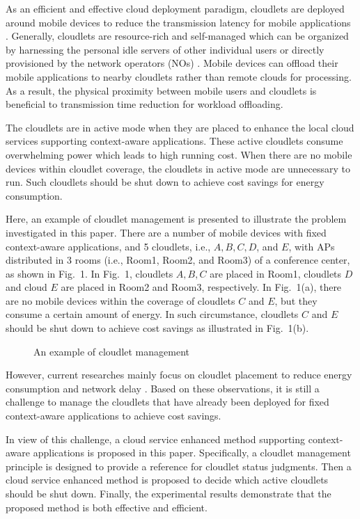 \documentclass{llncs}
\begin{document}
As an efficient and effective cloud deployment paradigm, cloudlets are deployed around mobile devices to reduce the transmission latency for mobile applications \cite{rimal:van,dinh:lee}. Generally, cloudlets are resource-rich and self-managed which can be organized by harnessing the personal idle servers of other individual users or directly provisioned by the network operators (NOs) \cite{lo:gao}. Mobile devices can offload their mobile applications to nearby cloudlets rather than remote clouds for processing. As a result, the physical proximity between mobile users and cloudlets is beneficial to transmission time reduction for workload offloading.

The cloudlets are in active mode when they are placed to enhance the local cloud services supporting context-aware applications. These active cloudlets consume overwhelming power which leads to high running cost. When there are no mobile devices within cloudlet coverage, the cloudlets in active mode are unnecessary to run. Such cloudlets should be shut down to achieve cost savings for energy consumption.

Here, an example of cloudlet management is presented to illustrate the problem investigated in this paper. There are a number of mobile devices with fixed context-aware applications, and 5 cloudlets, i.e., $A, B, C, D$, and $E$, with APs distributed in 3 rooms (i.e., Room1, Room2, and Room3) of a conference center, as shown in Fig.~1. In Fig.~1, cloudlets $A, B, C$ are placed in Room1, cloudlets $D$ and cloud $E$ are placed in Room2 and Room3, respectively. In Fig.~1(a), there are no mobile devices within the coverage of cloudlets $C$ and $E$, but they consume a certain amount of energy. In such circumstance, cloudlets $C$ and $E$ should be shut down to achieve cost savings as illustrated in Fig.~1(b).

\begin{figure}
\centering
{}
\caption{An example of cloudlet management}
\end{figure}

However, current researches mainly focus on cloudlet placement to reduce energy consumption and network delay \cite{xu:liang:2,jia:cao}. Based on these observations, it is still a challenge to manage the cloudlets that have already been deployed for fixed context-aware applications to achieve cost savings.

In view of this challenge, a cloud service enhanced method supporting context-aware applications is proposed in this paper. Specifically, a cloudlet management principle is designed to provide a reference for cloudlet status judgments. Then a cloud service enhanced method is proposed to decide which active cloudlets should be shut down. Finally, the experimental results demonstrate that the proposed method is both effective and efficient.
\end{document}
